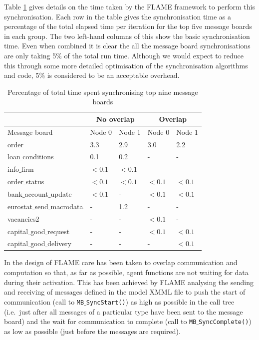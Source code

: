 Table \ref{table:overlap} gives details on the time taken by the FLAME framework to perform this synchronisation. Each row in the table gives the synchronisation time as a percentage of  the total elapsed time per iteration for the top five message boards in each group. The two left-hand columns of this show the basic synchronisation time. Even when combined it is clear the all the message board synchronisations are only taking 5\% of the total run time. Although we would expect to reduce this through some more detailed optimisation of the synchronisation algorithms and code, 5\% is considered to be an acceptable overhead.

\begin{table}[ht]
\centering
\begin{tabular}{|l|l|l|l|l|}\hline
              & \multicolumn{2}{c|}{No overlap} & \multicolumn{2}{c|}{Overlap} \\ \hline
Message board & Node 0 & Node 1 & Node 0 & Node 1 \\ \hline \hline
order & 3.3 & 2.9 & 3.0 & 2.2 \\ \hline
loan$\_$conditions & 0.1 & 0.2 & - & - \\ \hline
info$\_$firm & $<0.1$ & $<0.1$ & - & -  \\ \hline
order$\_$status & $<0.1$ & $<0.1$ & $<0.1$ & $<0.1$ \\ \hline
bank$\_$account$\_$update & $<0.1$ & - & $<0.1$ & $<0.1$ \\ \hline
eurostat$\_$send$\_$macrodata & - & 1.2 & - & -  \\ \hline
vacancies2 & - & - & $<0.1$ & -  \\ \hline
capital$\_$good$\_$request & - & - & $<0.1$ & $<0.1$ \\ \hline
capital$\_$good$\_$delivery & - & - & - & $<0.1$ \\ \hline 
\end{tabular}
\caption{Percentage of total time spent synchronising top nine message boards}
\label{table:overlap}
\end{table}

In the design of FLAME care has been taken to overlap communication and computation so that, as far as possible, agent functions are not waiting for data during their activation. This has been achieved by FLAME analysing the sending and receiving of messages defined in the model XMML file to push the start of communication (call to \texttt{MB$\_$SyncStart()}) as high as possible in the call tree (i.e.\ just after all messages of a particular type have been sent to the message board) and the wait for communication to complete (call to \texttt{MB$\_$SyncComplete()}) as low as possible (just before the messages are required).

